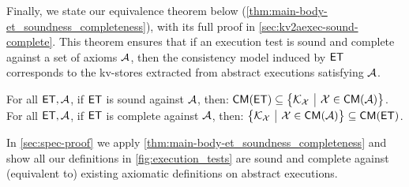 Finally, we state our equivalence theorem below (\cref{thm:main-body-et_soundness_completeness}), with its full proof in \cref{sec:kv2aexec-sound-complete}. 
This theorem ensures that if an execution test is sound and complete against a set of axioms $\mathcal{A}$, 
then the consistency model induced by $\mathsf{ET}$ corresponds to the kv-stores extracted from abstract executions satisfying $\mathcal{A}$.

\begin{theorem}
\label{thm:main-body-et_soundness_completeness}
For all $\mathsf{ET}, \mathcal{A}$, if $\mathsf{ET}$ is sound against $\mathcal{A}$, then:
\(
\CMs(\ET) \subseteq \Set{ \mkvs_\aexec }[ \aexec \in \CMs(\Ax)]
\).
For all $\mathsf{ET}, \mathcal{A}$, if $\mathsf{ET}$ is complete against $\mathcal{A}$, then:
\(
\Set{ \mkvs_\aexec }[ \aexec \in \CMs(\Ax)]  \subseteq \CMs(\ET)
\).
\end{theorem} 

In \cref{sec:spec-proof} we apply \cref{thm:main-body-et_soundness_completeness} and show all our definitions in \cref{fig:execution_tests} 
are sound and complete against (equivalent to) existing axiomatic definitions on abstract executions.
